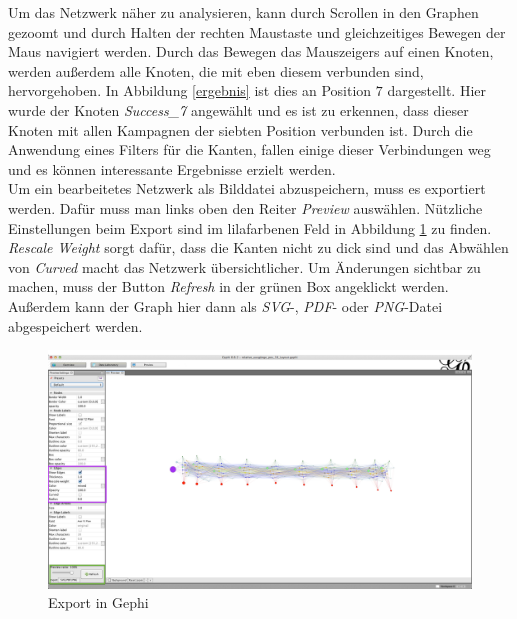 Um das Netzwerk näher zu analysieren, kann durch Scrollen in den Graphen gezoomt und durch Halten der rechten Maustaste und gleichzeitiges Bewegen der Maus navigiert werden. Durch das Bewegen das Mauszeigers auf einen Knoten, werden außerdem alle Knoten, die mit eben diesem verbunden sind, hervorgehoben. In Abbildung \ref{ergebnis} ist dies an Position $7$ dargestellt. Hier wurde der Knoten \textit{Success\_7} angewählt und es ist zu erkennen, dass dieser Knoten mit allen Kampagnen der siebten Position verbunden ist. Durch die Anwendung eines Filters für die Kanten, fallen einige dieser Verbindungen weg und es können interessante Ergebnisse erzielt werden.\\
Um ein bearbeitetes Netzwerk als Bilddatei abzuspeichern, muss es exportiert werden. Dafür muss man links oben den Reiter \textit{Preview} auswählen. Nützliche Einstellungen beim Export sind im lilafarbenen Feld in Abbildung \ref{export} zu finden. \textit{Rescale Weight} sorgt dafür, dass die Kanten nicht zu dick sind und das Abwählen von \textit{Curved} macht das Netzwerk übersichtlicher. Um Änderungen sichtbar zu machen, muss der Button \textit{Refresh} in der grünen Box angeklickt werden. Außerdem kann der Graph hier dann als \textit{SVG}-, \textit{PDF}- oder \textit{PNG}-Datei abgespeichert werden.
\begin{figure}[H]
    \centering\includegraphics[scale=0.23]{Preview.png}\caption{Export in Gephi}\label{export}
\end{figure}
